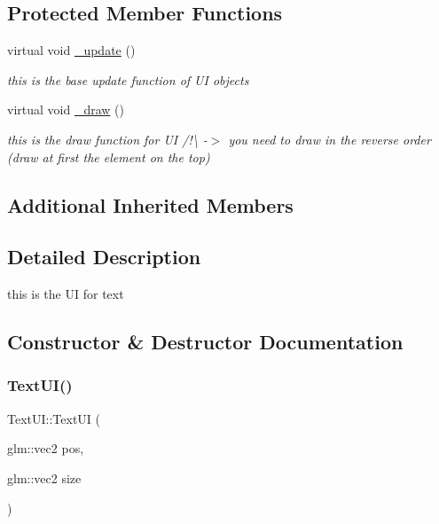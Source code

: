 \subsection*{Protected Member Functions}
\begin{DoxyCompactItemize}
\item 
\mbox{\label{class_text_u_i_a663721b95cff471a1e08dc2030dc802a}} 
virtual void \hyperlink{class_text_u_i_a663721b95cff471a1e08dc2030dc802a}{\+\_\+update} ()
\begin{DoxyCompactList}\small\item\em this is the base update function of UI objects \end{DoxyCompactList}\item 
\mbox{\label{class_text_u_i_a1d4c78e84b108a8b9064c901e8c67d10}} 
virtual void \hyperlink{class_text_u_i_a1d4c78e84b108a8b9064c901e8c67d10}{\+\_\+draw} ()
\begin{DoxyCompactList}\small\item\em this is the draw function for UI /!\textbackslash{} -\/$>$ you need to draw in the reverse order (draw at first the element on the top) \end{DoxyCompactList}\end{DoxyCompactItemize}
\subsection*{Additional Inherited Members}


\subsection{Detailed Description}
this is the UI for text 

\subsection{Constructor \& Destructor Documentation}
\mbox{\label{class_text_u_i_ac985cfaf70bceed7f26d1f184836e523}} 
\subsubsection{\texorpdfstring{Text\+U\+I()}{TextUI()}\hspace{0.1cm}{\footnotesize\ttfamily [1/2]}}
{\footnotesize\ttfamily Text\+U\+I\+::\+Text\+UI (\begin{DoxyParamCaption}\item[{glm\+::vec2}]{pos,  }\item[{glm\+::vec2}]{size }\end{DoxyParamCaption})}



